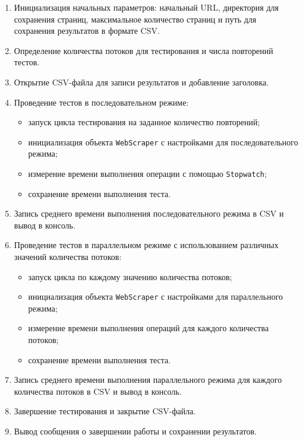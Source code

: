 \begin{enumerate}
    \item Инициализация начальных параметров: начальный URL, директория для сохранения страниц, максимальное количество страниц и путь для сохранения результатов в формате CSV.
    \item Определение количества потоков для тестирования и числа повторений тестов.
    \item Открытие CSV-файла для записи результатов и добавление заголовка.
    \item Проведение тестов в последовательном режиме:
    \begin{itemize}
        \item запуск цикла тестирования на заданное количество повторений;
        \item инициализация объекта \texttt{WebScraper} с настройками для последовательного режима;
        \item измерение времени выполнения операции с помощью \texttt{Stopwatch};
        \item сохранение времени выполнения теста.
    \end{itemize}
    \item Запись среднего времени выполнения последовательного режима в CSV и вывод в консоль.
    \item Проведение тестов в параллельном режиме с использованием различных значений количества потоков:
    \begin{itemize}
        \item запуск цикла по каждому значению количества потоков;
        \item инициализация объекта \texttt{WebScraper} с настройками для параллельного режима;
        \item измерение времени выполнения операций для каждого количества потоков;
        \item сохранение времени выполнения теста.
    \end{itemize}
    \item Запись среднего времени выполнения параллельного режима для каждого количества потоков в CSV и вывод в консоль.
    \item Завершение тестирования и закрытие CSV-файла.
    \item Вывод сообщения о завершении работы и сохранении результатов.
\end{enumerate}

